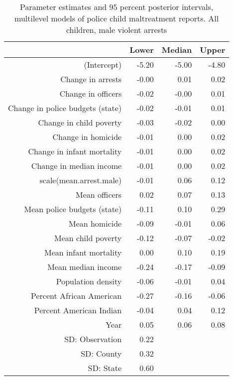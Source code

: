 \begin{table}[ht]
\centering
\begin{tabular}{rrrr}
  \hline
 & Lower & Median & Upper \\ 
  \hline
(Intercept) & -5.20 & -5.00 & -4.80 \\ 
  Change in arrests & -0.00 & 0.01 & 0.02 \\ 
  Change in officers & -0.02 & -0.00 & 0.01 \\ 
  Change in police budgets (state) & -0.02 & -0.01 & 0.01 \\ 
  Change in child poverty & -0.03 & -0.02 & 0.00 \\ 
  Change in homicide & -0.01 & 0.00 & 0.02 \\ 
  Change in infant mortality & -0.01 & 0.00 & 0.02 \\ 
  Change in median income & -0.01 & 0.00 & 0.02 \\ 
  scale(mean.arrest.male) & -0.01 & 0.06 & 0.12 \\ 
  Mean officers & 0.02 & 0.07 & 0.13 \\ 
  Mean police budgets (state) & -0.11 & 0.10 & 0.29 \\ 
  Mean homicide & -0.09 & -0.01 & 0.06 \\ 
  Mean child poverty & -0.12 & -0.07 & -0.02 \\ 
  Mean infant mortality & 0.00 & 0.10 & 0.19 \\ 
  Mean median income & -0.24 & -0.17 & -0.09 \\ 
  Population density & -0.06 & -0.01 & 0.04 \\ 
  Percent African American & -0.27 & -0.16 & -0.06 \\ 
  Percent American Indian & -0.04 & 0.04 & 0.12 \\ 
  Year & 0.05 & 0.06 & 0.08 \\ 
  SD: Observation & 0.22 &  &  \\ 
  SD: County & 0.32 &  &  \\ 
  SD: State & 0.60 &  &  \\ 
   \hline
\end{tabular}
\caption{Parameter estimates and 95 percent posterior intervals, multilevel models of 
             police child maltreatment reports. All children, male violent arrests} 
\end{table}

